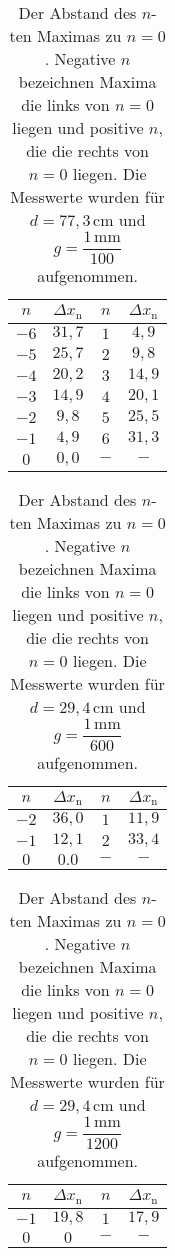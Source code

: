 \begin{table}[H]
    \centering
    \caption{Der Abstand des $n$-ten Maximas zu $n = 0$. Negative $n$ bezeichnen Maxima die links von $n = 0$ liegen und positive $n$, die die rechts von $n = 0$ liegen. Die Messwerte wurden für $d = 77,3 \, \unit{\centi\meter}$ und $g = \dfrac{1 \, \unit{\milli\meter}}{100}$ aufgenommen.}
    \label{tab:Well_100}
    \begin{tabular}{c c c c}
    \toprule
     $n$ & $\Delta x_\text{n}$ &   $n$ & $\Delta x_\text{n}$\\
    \midrule
    $-6$ &  $31,7 $&      $1$   &$4,9$ \\
    $-5$ &  $25,7 $&      $2$   &$9,8$ \\
    $-4$ &  $20,2 $&      $3$   &$14,9$ \\
    $-3$ &  $14,9 $&      $4$   &$20,1$ \\
    $-2$ &  $9,8  $&      $5$   &$25,5$ \\
    $-1$ &  $4,9  $&      $6$   &$31,3$ \\   
    $ 0$ &  $0,0  $&      $-$   &$-$    \\
    \bottomrule
    \end{tabular}
    \end{table}

\begin{table}[H]
    \centering
    \caption{Der Abstand des $n$-ten Maximas zu $n = 0$. Negative $n$ bezeichnen Maxima die links von $n = 0$ liegen und positive $n$, die die rechts von $n = 0$ liegen. Die Messwerte wurden für $d = 29,4 \, \unit{\centi\meter}$ und $g = \dfrac{1 \, \unit{\milli\meter}}{600}$ aufgenommen.}
    \label{tab:Well_600}
    \begin{tabular}{c c c c}
    \toprule
     $n$ & $\Delta x_\text{n}$ &   $n$ & $\Delta x_\text{n}$\\
    \midrule
    $-2$ & $36,0$ & $1$ & $ 11,9$ \\
    $-1$ & $12,1$ & $2$ & $ 33,4$ \\
    $0$ & $ 0.0$  & $- $ & $ - $\\
   \bottomrule
    \end{tabular}
    \end{table}

\begin{table}[H]
    \centering
    \caption{Der Abstand des $n$-ten Maximas zu $n = 0$. Negative $n$ bezeichnen Maxima die links von $n = 0$ liegen und positive $n$, die die rechts von $n = 0$ liegen. Die Messwerte wurden für $d = 29,4 \, \unit{\centi\meter}$ und $g = \dfrac{1 \, \unit{\milli\meter}}{1200}$ aufgenommen.}
    \label{tab:Well_1600}
    \begin{tabular}{c c c c}
    \toprule
     $n$ & $\Delta x_\text{n}$ &   $n$ & $\Delta x_\text{n}$\\
    \midrule
    $-1$ & $19,8$   & $1$ & $ 17,9$   \\
    $0$  & $0   $   & $-$ & $ -   $   \\
    \bottomrule
    \end{tabular}
    \end{table}

